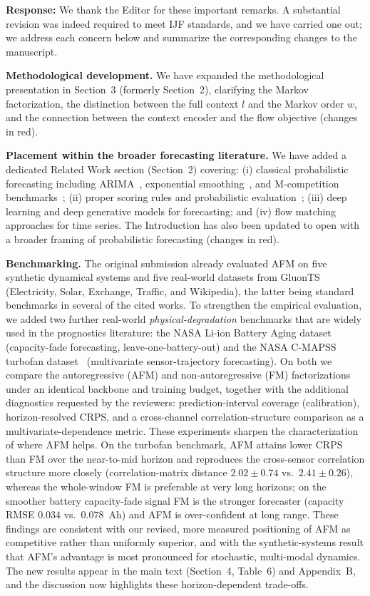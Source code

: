\documentclass[11pt]{article}
\newcommand{\authorresponse}[1]{%
  \textbf{Response:} #1\par\medskip
}
\begin{document}
\authorresponse{%
We thank the Editor for these important remarks. A substantial revision was indeed required to meet IJF standards, and we have carried one out; we address each concern below and summarize the corresponding changes to the manuscript.

\textbf{Methodological development.} We have expanded the methodological presentation in Section~3 (formerly Section~2), clarifying the Markov factorization, the distinction between the full context $l$ and the Markov order $w$, and the connection between the context encoder and the flow objective (changes in red).

\textbf{Placement within the broader forecasting literature.} We have added a dedicated Related Work section (Section~2) covering: (i) classical probabilistic forecasting including ARIMA~\cite{Box1994Timeseries}, exponential smoothing~\cite{hyndman2008forecasting}, and M-competition benchmarks~\cite{makridakis2020m4}; (ii) proper scoring rules and probabilistic evaluation~\cite{gneiting2007strictly,winkler1996scoring}; (iii) deep learning and deep generative models for forecasting; and (iv) flow matching approaches for time series. The Introduction has also been updated to open with a broader framing of probabilistic forecasting (changes in red).

\textbf{Benchmarking.} The original submission already evaluated AFM on five synthetic dynamical systems and five real-world datasets from GluonTS~\cite{alexandrov2020gluonts} (Electricity, Solar, Exchange, Traffic, and Wikipedia), the latter being standard benchmarks in several of the cited works. To strengthen the empirical evaluation, we added two further real-world \emph{physical-degradation} benchmarks that are widely used in the prognostics literature: the NASA Li-ion Battery Aging dataset~\cite{saha2007battery} (capacity-fade forecasting, leave-one-battery-out) and the NASA C-MAPSS turbofan dataset~\cite{saxena2008cmapss} (multivariate sensor-trajectory forecasting). On both we compare the autoregressive (AFM) and non-autoregressive (FM) factorizations under an identical backbone and training budget, together with the additional diagnostics requested by the reviewers: prediction-interval coverage (calibration), horizon-resolved CRPS, and a cross-channel correlation-structure comparison as a multivariate-dependence metric. These experiments sharpen the characterization of where AFM helps. On the turbofan benchmark, AFM attains lower CRPS than FM over the near-to-mid horizon and reproduces the cross-sensor correlation structure more closely (correlation-matrix distance $2.02\!\pm\!0.74$ vs.\ $2.41\!\pm\!0.26$), whereas the whole-window FM is preferable at very long horizons; on the smoother battery capacity-fade signal FM is the stronger forecaster (capacity RMSE $0.034$ vs.\ $0.078$~Ah) and AFM is over-confident at long range. These findings are consistent with our revised, more measured positioning of AFM as competitive rather than uniformly superior, and with the synthetic-systems result that AFM's advantage is most pronounced for stochastic, multi-modal dynamics. The new results appear in the main text (Section~4, Table~6) and Appendix~B, and the discussion now highlights these horizon-dependent trade-offs.
}
\end{document}

